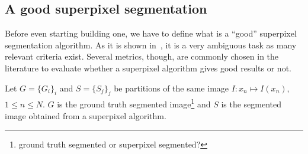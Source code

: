 \documentclass{article}
\begin{document}
    \subsection{A good superpixel segmentation}
        \label{par:metrics}
        Before even starting building one, we have to define what is a ``good'' superpixel segmentation algorithm. As it is shown in~\cite{stutz2017}, it is a very ambiguous task as many relevant criteria exist. Several metrics, though, are commonly chosen in the literature to evaluate whether a superpixel algorithm gives good results or not.

        Let $G = \{G_i\}_i$ and $S = \{S_j\}_j$ be partitions of the same image $I : x_n \mapsto I(x_n)$, $1 \leq n \leq N$. $G$ is the ground truth segmented image\footnote{ground truth segmented or superpixel segmented?} and $S$ is the segmented image obtained from a superpixel algorithm.
\end{document}
